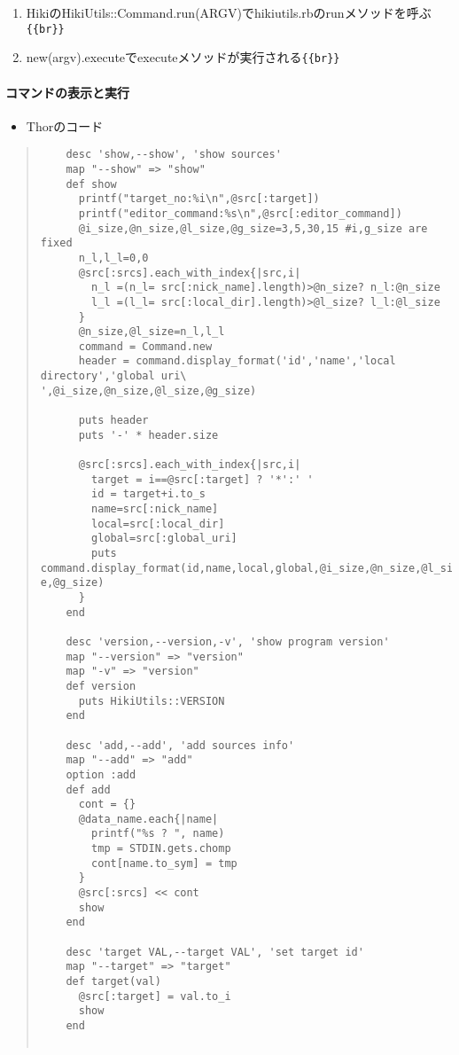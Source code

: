 \documentclass[10pt,a4j]{article}
\begin{document}
\begin{enumerate}
\item HikiのHikiUtils::Command.run(ARGV)でhikiutils.rbのrunメソッドを呼ぶ\verb|{{br}}|
\item new(argv).executeでexecuteメソッドが実行される\verb|{{br}}|
\end{enumerate}
\paragraph{コマンドの表示と実行}
\begin{itemize}
\item Thorのコード
\end{itemize}\begin{quote}\begin{verbatim}
    desc 'show,--show', 'show sources'
    map "--show" => "show"
    def show
      printf("target_no:%i\n",@src[:target])
      printf("editor_command:%s\n",@src[:editor_command])
      @i_size,@n_size,@l_size,@g_size=3,5,30,15 #i,g_size are fixed             
      n_l,l_l=0,0
      @src[:srcs].each_with_index{|src,i|
        n_l =(n_l= src[:nick_name].length)>@n_size? n_l:@n_size
        l_l =(l_l= src[:local_dir].length)>@l_size? l_l:@l_size
      }
      @n_size,@l_size=n_l,l_l
      command = Command.new
      header = command.display_format('id','name','local directory','global uri\
',@i_size,@n_size,@l_size,@g_size)

      puts header
      puts '-' * header.size

      @src[:srcs].each_with_index{|src,i|
        target = i==@src[:target] ? '*':' '
        id = target+i.to_s
        name=src[:nick_name]
        local=src[:local_dir]
        global=src[:global_uri]
        puts command.display_format(id,name,local,global,@i_size,@n_size,@l_siz\
e,@g_size)
      }
    end

    desc 'version,--version,-v', 'show program version'
    map "--version" => "version"
    map "-v" => "version"
    def version
      puts HikiUtils::VERSION
    end

    desc 'add,--add', 'add sources info'
    map "--add" => "add"
    option :add
    def add
      cont = {}
      @data_name.each{|name|
        printf("%s ? ", name)
        tmp = STDIN.gets.chomp
        cont[name.to_sym] = tmp
      }
      @src[:srcs] << cont
      show
    end

    desc 'target VAL,--target VAL', 'set target id'
    map "--target" => "target"
    def target(val)
      @src[:target] = val.to_i
      show
    end


\end{verbatim}
\end{quote}
\end{document}
